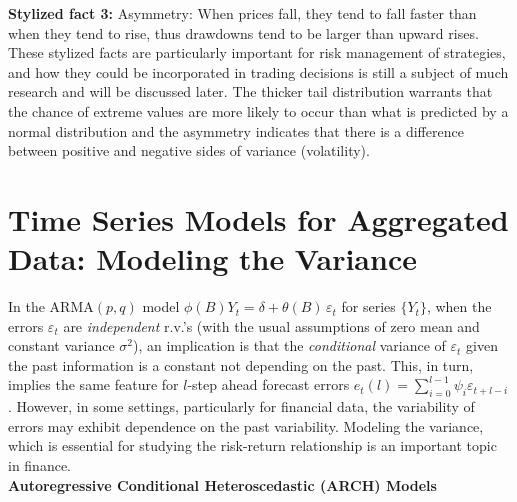 \noindent\textbf{Stylized fact 3:} Asymmetry: When prices fall, they tend to fall faster
than when they tend to rise, thus drawdowns tend to be larger than upward rises. \\


These stylized facts are particularly important for risk management of strategies, and how they could be incorporated in trading decisions is still a subject of much research and will be discussed later. The thicker tail distribution warrants that the chance of extreme values are more likely to occur than what is predicted by a normal distribution and the asymmetry indicates that there is a difference between positive and negative sides of variance (volatility). 


\section{Time Series Models for Aggregated Data: Modeling the Variance}


In the ARMA$(p,q)$ model $\phi(B)Y_t= \delta + \theta(B) \,\varepsilon_t$ for series $\{Y_t\}$, when the errors $\varepsilon_t$ are \textit{independent} r.v.'s (with the usual assumptions of zero mean and constant variance $\sigma^2$), an implication is that the \textit{conditional} variance of $\varepsilon_t$ given the past information is a constant not depending on the past. This, in turn, implies the same feature for $l$-step ahead forecast errors $e_t(l) = \sum_{i=0}^{l-1}\psi_i\varepsilon_{t+l-i}$. However, in some settings, particularly for financial data, the variability of errors may exhibit dependence on the past variability. Modeling the variance, which is essential for studying the risk-return relationship is an important topic in finance. \\


\noindent \textbf{Autoregressive Conditional Heteroscedastic (ARCH) Models} \\


